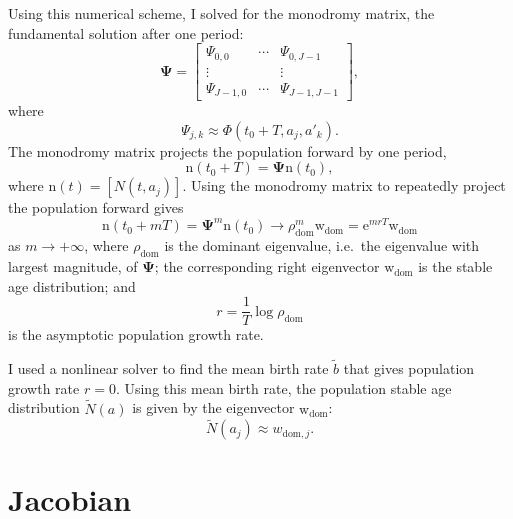 \documentclass[USenglish]{article}
\renewcommand{\vec}[1]{\boldsymbol{\mathrm{#1}}}
\newcommand{\mat}[1]{\mathbf{#1}}
\newcommand{\me}{\mathrm{e}}
\begin{document}
Using this numerical scheme, I solved for the monodromy matrix, the
fundamental solution after one period:
\begin{equation}
  \mat{\Psi} =
  \begin{bmatrix}
    \Psi_{0, 0} & \cdots & \Psi_{0, J - 1} \\
    \vdots & & \vdots \\
    \Psi_{J - 1, 0} & \cdots & \Psi_{J - 1, J - 1}
  \end{bmatrix},
\end{equation}
where
\begin{equation}
  \Psi_{j, k} \approx \Phi(t_0 + T, a_j, a'_k).
\end{equation}
The monodromy matrix projects the population forward by one period,
\begin{equation}
  \vec{n}(t_0 + T) = \mat{\Psi} \vec{n}(t_0),
\end{equation}
where $\vec{n}(t) = [N(t, a_j)]$.
Using the monodromy matrix to repeatedly project the population
forward gives
\begin{equation}
  \vec{n}(t_0 + m T)
  = \mat{\Psi}^m \vec{n}(t_0)
  \to \rho_{\mathrm{dom}}^m \vec{w}_{\mathrm{dom}}
  = \me^{m r T} \vec{w}_{\mathrm{dom}}
\end{equation}
as $m \to +\infty$, where $\rho_{\mathrm{dom}}$ is the dominant eigenvalue,
i.e.~the eigenvalue with largest magnitude, of $\mat{\Psi}$;
the corresponding right eigenvector $\vec{w}_{\mathrm{dom}}$ is the
stable age distribution; and
\begin{equation}
  r = \frac{1}{T} \log \rho_{\mathrm{dom}}
\end{equation}
is the asymptotic population growth rate.

I used a nonlinear solver to find the mean birth rate $\tilde{b}$ that
gives population growth rate $r = 0$. Using this mean birth rate, the
population stable age distribution $\tilde{N}(a)$ is given by the
eigenvector $\vec{w}_{\mathrm{dom}}$:
\begin{equation}
  \tilde{N}(a_j) \approx w_{\mathrm{dom}, j}.
\end{equation}


\section{Jacobian}
\end{document}
